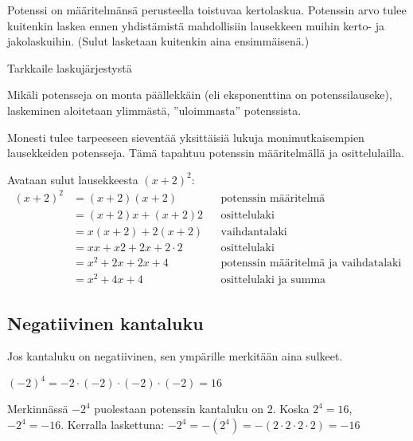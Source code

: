 Potenssi on määritelmänsä perusteella toistuvaa kertolaskua. Potenssin arvo tulee kuitenkin laskea ennen yhdistämistä mahdollisiin lausekkeen muihin kerto- ja jakolaskuihin. (Sulut lasketaan kuitenkin aina ensimmäisenä.)

    \begin{esimerkki}
      Tarkkaile laskujärjestystä
    \end{esimerkki}  

Mikäli potensseja on monta päällekkäin (eli eksponenttina on potenssilauseke), laskeminen aloitetaan ylimmästä, ''uloimmasta'' potenssista.

\begin{esimerkki}
\end{esimerkki}

Monesti tulee tarpeeseen sieventää yksittäisiä lukuja monimutkaisempien lausekkeiden potensseja. Tämä tapahtuu potenssin määritelmällä ja osittelulailla.
\begin{esimerkki}
 Avataan sulut lausekkeesta $(x+2)^2$:
	\begin{align*}
	(x+2)^2
	&=(x+2)(x+2) && \text{potenssin määritelmä} \\
	&=(x+2)x+(x+2)2 && \text{osittelulaki} \\
	&=x(x+2)+2(x+2) && \text{vaihdantalaki} \\
	&=xx+x2+2x+2\cdot2 && \text{osittelulaki} \\
	&=x^2+2x+2x+4 && \text{potenssin määritelmä ja vaihdatalaki} \\
	&=x^2+4x+4 && \text{osittelulaki ja summa}
	\end{align*}
	
\end{esimerkki} %

\subsection{Negatiivinen kantaluku}

Jos kantaluku on negatiivinen, sen ympärille merkitään aina sulkeet.

\begin{esimerkki}
$(-2)^4 = -2 \cdot (-2)\cdot(-2)\cdot(-2) = 16$

Merkinnässä $-2^4$ puolestaan potenssin kantaluku on $2$. Koska $2^4 = 16$,
$-2^4=-16$. Kerralla laskettuna: $-2^4 =-(2^4)= -(2 \cdot 2\cdot 2 \cdot 2) = -16$
\end{esimerkki}

